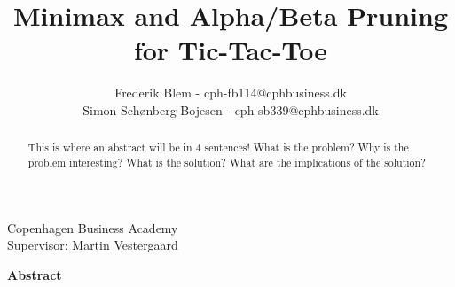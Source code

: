 \documentclass[
english, %
headsepline, %
]{scrartcl} %
\begin{document}
\begin{titlepage}
\title{Minimax and Alpha/Beta Pruning for Tic-Tac-Toe}
\author{Frederik Blem - cph-fb114@cphbusiness.dk\\
Simon Schønberg Bojesen - cph-sb339@cphbusiness.dk}
\subtitle{}
\maketitle
\begin{center}
    \large
        Copenhagen Business Academy\\
        Supervisor: Martin Vestergaard\\
    \normalsize
\end{center}

\thispagestyle{empty}

\end{titlepage}
\clearpage

\Large
    \textbf{Abstract}
    \begin{abstract}
        \label{sec:abstract}
        This is where an abstract will be in 4 sentences! What is the problem? Why is the problem interesting? What is the solution? 
        What are the implications of the solution?
    \end{abstract}
\normalsize  
\clearpage

\tableofcontents %

\listoffigures %

\listoftables %
\clearpage








\end{document}
